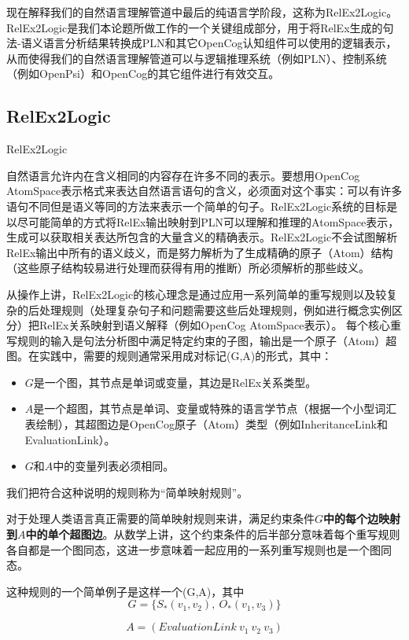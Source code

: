 现在解释我们的自然语言理解管道中最后的纯语言学阶段，这称为RelEx2Logic。RelEx2Logic是我们本论题所做工作的一个关键组成部分，用于将RelEx生成的句法-语义语言分析结果转换成PLN和其它OpenCog认知组件可以使用的逻辑表示，从而使得我们的自然语言理解管道可以与逻辑推理系统（例如PLN）、控制系统（例如OpenPsi）和OpenCog的其它组件进行有效交互。

\subsection{RelEx2Logic}{RelEx2Logic}

自然语言允许内在含义相同的内容存在许多不同的表示。要想用OpenCog AtomSpace表示格式来表达自然语言语句的含义，必须面对这个事实：可以有许多语句不同但是语义等同的方法来表示一个简单的句子。RelEx2Logic系统的目标是以尽可能简单的方式将RelEx输出映射到PLN可以理解和推理的AtomSpace表示，生成可以获取相关表达所包含的大量含义的精确表示。RelEx2Logic不会试图解析RelEx输出中所有的语义歧义，而是努力解析为了生成精确的原子（Atom）结构（这些原子结构较易进行处理而获得有用的推断）所必须解析的那些歧义。

从操作上讲，RelEx2Logic的核心理念是通过应用一系列简单的重写规则以及较复杂的后处理规则（处理复杂句子和问题需要这些后处理规则，例如进行概念实例区分）把RelEx关系映射到语义解释（例如OpenCog AtomSpace表示）。
每个核心重写规则的输入是句法分析图中满足特定约束的子图，输出是一个原子（Atom）超图。在实践中，需要的规则通常采用成对标记(G,A)的形式，其中：

\begin{itemize}
\item $G$是一个图，其节点是单词或变量，其边是RelEx关系类型。
\item  $A$是一个超图，其节点是单词、变量或特殊的语言学节点（根据一个小型词汇表绘制），其超图边是OpenCog原子（Atom）类型（例如InheritanceLink和EvaluationLink）。
\item $G$和$A$中的变量列表必须相同。
\end{itemize}

我们把符合这种说明的规则称为“简单映射规则”。

对于处理人类语言真正需要的简单映射规则来讲，满足约束条件{\bf $G$中的每个边映射到$A$中的单个超图边}。从数学上讲，这个约束条件的后半部分意味着每个重写规则各自都是一个图同态\cite{Voloshin2009}，这进一步意味着一起应用的一系列重写规则也是一个图同态。

这种规则的一个简单例子是这样一个(G,A)，其中
$$
G = \{ S_*(v_1,v_2), \ O_*(v_1, v_3) \}
$$

$$
A = (EvaluationLink \ v_1 \ v_2 \ v_3)
$$

